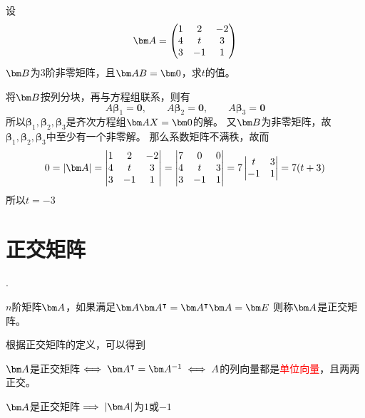 \begin{example}
    设
    \[
        \mat{A} =
        \begin{pmatrix}
            1 & 2  & -2 \\
            4 & t  & 3  \\
            3 & -1 & 1
        \end{pmatrix}
    \]
    $\mat{B}$为$3$阶非零矩阵，且$\mat{AB}=\mat{0}$，求$t$的值。
\end{example}
\begin{solution}
    将$\mat{B}$按列分块，再与方程组联系，则有
    \[ A\bm{\beta}_1 = \bm{0},\qquad A\bm{\beta}_2 = \bm{0},\qquad A\bm{\beta}_3 = \bm{0} \]
    所以$\bm{\beta}_1,\bm{\beta}_2,\bm{\beta}_3$是齐次方程组$\mat{AX}=\mat{0}$的解。
    又$\mat{B}$为非零矩阵，故$\bm{\beta}_1,\bm{\beta}_2,\bm{\beta}_3$中至少有一个非零解。
    那么系数矩阵不满秩，故而
    \[
        0 = |\mat{A}| =
        \begin{vmatrix}
            1 & 2  & -2 \\
            4 & t  & 3  \\
            3 & -1 & 1
        \end{vmatrix}
        =
        \begin{vmatrix}
            7 & 0  & 0 \\
            4 & t  & 3 \\
            3 & -1 & 1
        \end{vmatrix}
        =
        7\begin{vmatrix}
            t  & 3 \\
            -1 & 1
        \end{vmatrix}
        =
        7(t+3)
    \]
    所以$t=-3$
\end{solution}

\section{正交矩阵}
\label{sec:正交矩阵}
.
\begin{definition}
    $n$阶矩阵$\mat{A}$，如果满足$\mat{A}\mat{A}^\intercal = \mat{A}^\intercal \mat{A} = \mat{E}$
    则称$\mat{A}$是正交矩阵。
\end{definition}
根据正交矩阵的定义，可以得到
\begin{theorem}
    $\mat{A}$是正交矩阵$\iff \mat{A}^\intercal = \mat{A}^{-1} \iff A$的列向量都是\textcolor{red}{单位向量}，且两两正交。
\end{theorem}
\begin{theorem}
    $\mat{A}$是正交矩阵$\implies |\mat{A}|$为$1$或$-1$
\end{theorem}